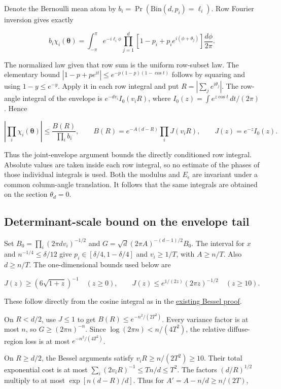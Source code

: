 \documentclass[11pt]{article}
\begin{document}
Denote the Bernoulli mean atom by
$b_i=\Pr(\mathrm{Bin}(d,p_i)=\ell_i)$. Row Fourier inversion gives exactly

\[
b_i\chi_i(\boldsymbol\theta)=\int_{-\pi}^{\pi}
e^{-i\ell_i\phi}
\prod_{j=1}^d [1-p_i+p_i e^{i(\phi+\theta_j)}]
\frac{d\phi}{2\pi}.
\]

The normalized law given that row sum is the uniform row-subset
law. The elementary bound
$|1-p+p e^{it}|\le e^{-p(1-p)(1-\cos t)}$ follows by squaring
and using $1-y\le e^{-y}$. Apply it in each row integral and put
$R=|\sum_j e^{i\theta_j}|$. The row-angle integral of the envelope
is $e^{-dv_i}I_0(v_i R)$, where
$I_0(z)=\int e^{z\cos t}\,dt/(2\pi)$. Hence

\[
\left|\prod_i\chi_i(\boldsymbol\theta)\right|
\le\frac{B(R)}{\prod_i b_i},\qquad
B(R)=e^{-A(d-R)}\prod_i J(v_iR),\qquad J(z)=e^{-z}I_0(z).
\]

Thus the joint-envelope argument bounds the directly conditioned
row integral. Absolute values are taken inside each row integral,
so no estimate of the phases of those individual integrals is used.
Both the modulus and $E_\epsilon$ are invariant under a common
column-angle translation. It follows that the same integrals are
obtained on the section $\theta_d=0$.

\subsection{Determinant-scale bound on the envelope tail}

Set $B_0=\prod_i(2\pi d v_i)^{-1/2}$ and
$G=\sqrt d(2\pi A)^{-(d-1)/2}B_0$.
The interval for $x$ and $n^{-1/4}\le\delta/12$ give
$p_i\in[\delta/4,1-\delta/4]$ and $v_i\ge1/T$, with $A\ge n/T$.
Also $d\ge n/T$. The one-dimensional bounds used below are

\[
J(z)\ge(6\sqrt{1+z})^{-1}\quad(z\ge0),\qquad
J(z)\le e^{1/(2z)}(2\pi z)^{-1/2}\quad(z\ge10).
\]

These follow directly from the cosine integral as in the
\href{https://github.com/ProgramComputer/open-math-research/blob/7b585bad34491cf9e733a316e1b62f6c3529880f/topics/balanced-arrays/bessel-margins/upper.md}{existing Bessel proof}.

On $R<d/2$, use $J\le1$ to get $B(R)\le e^{-n^2/(2T^2)}$.
Every variance factor is at most $n$, so $G\ge(2\pi n)^{-n}$.
Since $\log(2\pi n)< n/(4T^2)$, the relative diffuse-region
loss is at most $e^{-n^2/(4T^2)}$.

On $R\ge d/2$, the Bessel arguments satisfy $v_iR\ge n/(2T^2)\ge10$.
Their total exponential cost is at most
$\sum_i(2v_iR)^{-1}\le Tn/d\le T^2$.
The factors $(d/R)^{1/2}$ multiply to at most
$\exp[n(d-R)/d]$. Thus for $A'=A-n/d\ge n/(2T)$,
\end{document}
